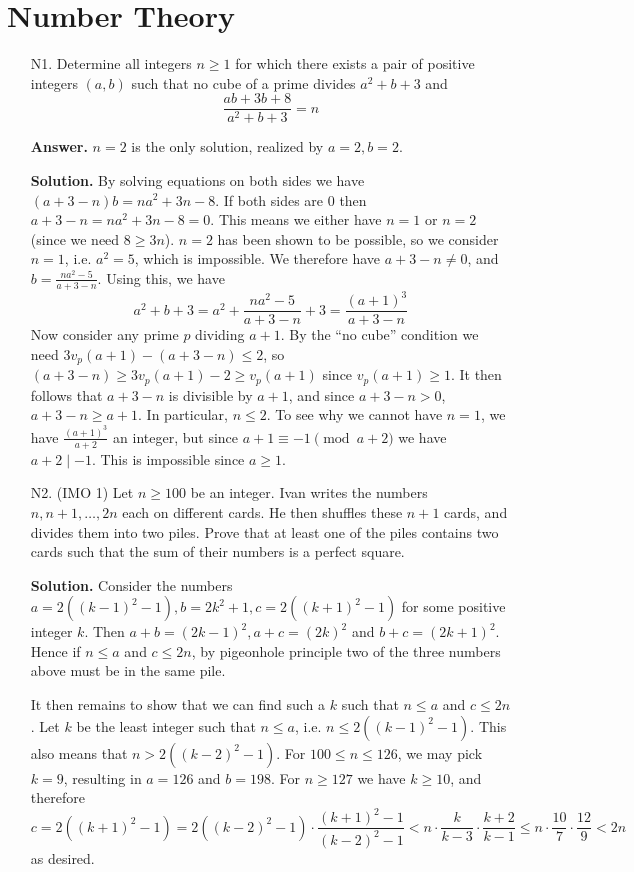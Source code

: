 \documentclass[11pt,a4paper]{article}
\begin{document}
	\section*{Number Theory}
	\begin{enumerate}
		\item [N1.] 
		Determine all integers $n\ge 1$ for which there exists a pair of positive integers $(a, b)$ such that 
		no cube of a prime divides $a^2+b+3$ and 
		\[
		\frac{ab+3b+8}{a^2+b+3} = n
		\]
		
		\textbf{Answer.} $n=2$ is the only solution, realized by $a=2, b=2$. 
		
		\textbf{Solution.} By solving equations on both sides we have $(a + 3 - n)b = na^2+3n - 8$. 
		If both sides are 0 then $a+3-n=na^2+3n-8=0$. 
		This means we either have $n=1$ or $n=2$ (since we need $8\ge 3n$). 
		$n=2$ has been shown to be possible, so we consider $n=1$, 
		i.e. $a^2=5$, which is impossible. 
		We therefore have $a+3-n\neq 0$, and $b=\frac{na^2-5}{a+3-n}$. 
		Using this, we have 
		\[
		a^2+b+3 = a^2 + \frac{na^2-5}{a+3-n} + 3 = \frac{(a+1)^3}{a + 3 - n}
		\]
		Now consider any prime $p$ dividing $a+1$. 
		By the ``no cube'' condition we need $3v_p(a+1) - (a+3-n)\le 2$, 
		so $(a+3-n)\ge 3v_p(a+1)-2\ge v_p(a+1)$ since $v_p(a+1)\ge 1$. 
		It then follows that $a+3-n$ is divisible by $a+1$, and since $a+3-n>0$, 
		$a+3-n\ge a+1$. In particular, $n\le 2$. 
		To see why we cannot have $n=1$, we have $\frac{(a+1)^3}{a+2}$ an integer, 
		but since $a+1\equiv -1\pmod{a+2}$ we have $a+2\mid -1$. 
		This is impossible since $a\ge 1$. 
		
		\item [N2.] 
		(IMO 1)
		Let $n \geqslant 100$ be an integer. Ivan writes the numbers $n, n+1, \ldots, 2 n$ each on different cards. 
		He then shuffles these $n+1$ cards, and divides them into two piles. 
		Prove that at least one of the piles contains two cards such that the sum of their numbers is a perfect square.
		
		\textbf{Solution.}
		Consider the numbers $a = 2((k-1)^2-1), b = 2k^2+1, c=2((k+1)^2-1)$ for some positive integer $k$. 
		Then $a + b = (2k-1)^2, a + c = (2k)^2$ and $b + c = (2k+1)^2$. Hence if $n\le a$ and $c\le 2n$, by pigeonhole principle two of the three numbers above must be in the same pile. 
		
		It then remains to show that we can find such a $k$ such that $n\le a$ and $c\le 2n$. 
		Let $k$ be the least integer such that $n\le a$, i.e. $n\le 2((k-1)^2-1)$. 
		This also means that $n > 2((k-2)^2-1)$. 
		For $100\le n\le 126$, we may pick $k = 9$, 
		resulting in $a=126$ and $b=198$. 
		For $n\ge 127$ we have $k\ge 10$, and therefore 
		\[
		c = 2((k+1)^2 - 1) = 2((k-2)^2-1) \cdot \frac{(k+1)^2-1}{(k-2)^2-1}
		< n \cdot \frac{k}{k - 3}\cdot \frac{k + 2}{k - 1}
		\le n \cdot \frac{10}{7}\cdot \frac{12}{9}
		< 2n
		\]
		as desired. 
		

\end{enumerate}
\end{document}
